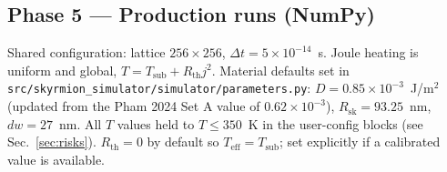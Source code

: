 \documentclass[11pt,a4paper]{article}
\newcommand{\jcur}{j}
\begin{document}
\subsection{Phase 5 --- Production runs (NumPy)}

Shared configuration: lattice $256 \times 256$,
$\Delta t = 5\times 10^{-14}$~s. Joule heating is uniform and
global, $T = T_{\text{sub}} + R_{\text{th}} \jcur^2$. Material
defaults set in \texttt{src/skyrmion\_simulator/simulator/parameters.py}: $D = 0.85
\times 10^{-3}$~J/m$^2$ (updated from the Pham 2024 Set A value
of $0.62 \times 10^{-3}$), $R_{\text{sk}} = 93.25$~nm, $dw = 27$~nm.
All $T$ values held to $T \le 350$~K in the user-config blocks (see
Sec.~\ref{sec:risks}). $R_{\text{th}} = 0$ by default so
$T_{\text{eff}} = T_{\text{sub}}$; set explicitly if a calibrated
value is available.
\end{document}
